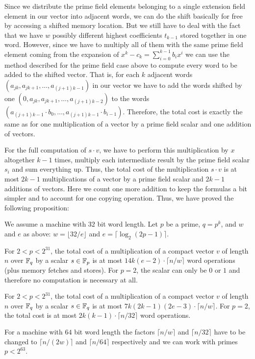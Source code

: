 Since we distribute the prime field elements belonging to a single
extension field element in our vector into adjacent words, we can 
do the shift basically for free by accessing a shifted memory location.
But we still have to deal with the fact that we have $w$ possibly different
highest coefficients $t_{k-1}$ stored together in one word. However,
since we have to multiply all of them with the same prime field element
coming from the expansion of $x^k - c_k = \sum_{i=0}^{k-1} b_i x^i$ 
we can use the method described
for the prime field case above to compute every word to be added to the
shifted vector. That is, for each $k$ adjacent words 
$(a_{jk},a_{jk+1},\ldots,a_{(j+1)k-1})$ in our vector we have to
add the words shifted by one $(0,a_{jk},a_{jk+1},\ldots,a_{(j+1)k-2})$
to the words $(a_{(j+1)k-1} \cdot b_0, \ldots, a_{(j+1)k-1} \cdot b_{i-1})$.
Therefore, the total cost is exactly the same as for one multiplication of
a vector by a prime field scalar and one addition of vectors.

For the full computation of $s \cdot v$, we have to perform this multiplication
by $x$ altogether $k-1$ times, multiply each intermediate result by the
prime field scalar $s_i$ and sum everything up. Thus, the total cost
of the multiplication $s \cdot v$ is at most $2k-1$ multiplications
of a vector by a prime field scalar and $2k-1$ additions of vectors.
Here we count one more addition to keep the formulas a bit simpler
and to account for one copying operation.
Thus, we have proved the following proposition:

\begin{Prop}
\label{multvec}
We assume a machine with $32$ bit word length.
Let $p$ be a prime, $q = p^k$, and $w$ and $e$ as above:
$w = \lfloor 32/e \rfloor$ and $e = \lceil \log_2(2p-1) \rceil$.

For $2 < p < 2^{31}$, the total cost of a multiplication of a compact 
vector $v$ of length $n$ over $\mathbb{F}_q$ by a scalar $s \in \mathbb{F}_p$ is at most 
$14k(e-2)\cdot \lceil n/w \rceil$ word operations (plus memory fetches
and stores). For $p=2$, the scalar
can only be $0$ or $1$ and therefore no computation is necessary at all.

For $2 < p < 2^{31}$, the total cost of a multiplication of a compact
vector $v$ of length $n$ over $\mathbb{F}_q$ by a scalar $s \in \mathbb{F}_q$ is at most
$7k(2k-1)(2e-3)\cdot \lceil n/w \rceil$. For $p = 2$, the total cost is
at most $2k(k-1) \cdot \lceil n/32 \rceil$ word operations.

For a machine with $64$ bit word length the factors $\lceil n/w \rceil$
and $\lceil n/32 \rceil$ have to be changed to $\lceil n/(2w) \rceil$
and $\lceil n/64 \rceil$ respectively
and we can work with primes $p < 2^{63}$.
\end{Prop}

